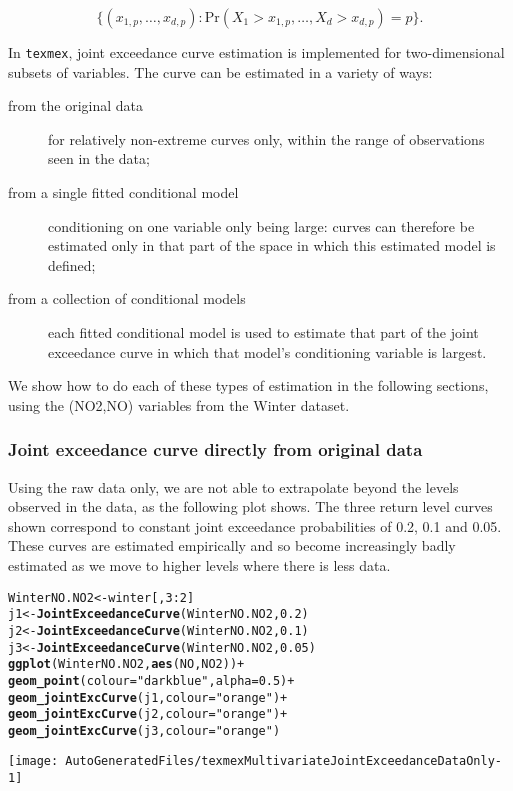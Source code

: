 \documentclass[10pt]{article}\usepackage[]{graphicx}\usepackage[]{color}
\makeatletter
\def\maxwidth{ %
  \ifdim\Gin@nat@width>\linewidth
    \linewidth
  \else
    \Gin@nat@width
  \fi
}
\newcommand{\hlnum}[1]{\textcolor[rgb]{0.686,0.059,0.569}{#1}}%
\newcommand{\hlstr}[1]{\textcolor[rgb]{0.192,0.494,0.8}{#1}}%
\newcommand{\hlopt}[1]{\textcolor[rgb]{0,0,0}{#1}}%
\newcommand{\hlstd}[1]{\textcolor[rgb]{0.345,0.345,0.345}{#1}}%
\newcommand{\hlkwb}[1]{\textcolor[rgb]{0.69,0.353,0.396}{#1}}%
\newcommand{\hlkwc}[1]{\textcolor[rgb]{0.333,0.667,0.333}{#1}}%
\newcommand{\hlkwd}[1]{\textcolor[rgb]{0.737,0.353,0.396}{\textbf{#1}}}%
\newenvironment{kframe}{%
 \def\at@end@of@kframe{}%
 \ifinner\ifhmode%
  \def\at@end@of@kframe{\end{minipage}}%
  \begin{minipage}{\columnwidth}%
 \fi\fi%
 \def\FrameCommand##1{\hskip\@totalleftmargin \hskip-\fboxsep
 \colorbox{shadecolor}{##1}\hskip-\fboxsep
     \hskip-\linewidth \hskip-\@totalleftmargin \hskip\columnwidth}%
 \MakeFramed {\advance\hsize-\width
   \@totalleftmargin\z@ \linewidth\hsize
   \@setminipage}}%
 {\par\unskip\endMakeFramed%
 \at@end@of@kframe}
\newenvironment{knitrout}{}{} %
\makeatother
\begin{document}
\[\{(x_{1,p},\ldots,x_{d,p}): \mbox{Pr}(X_1>x_{1,p},\ldots,X_d>x_{d,p}) = p\}.\]

In {\tt texmex}, joint exceedance curve estimation is implemented for two-dimensional subsets of variables.  The curve can be estimated in a variety of ways:

\begin{description}
\item[from the original data] for relatively non-extreme curves only, within the range of observations seen in the data;
\item[from a single fitted conditional model] conditioning on one variable only being large: curves can therefore be estimated only in that part of the space in which this estimated model is defined;
\item[from a collection of conditional models] each fitted conditional model is used to estimate that part of the joint exceedance curve in which that model's conditioning variable is largest.
\end{description}

We show how to do each of these types of estimation in the following sections, using the (NO2,NO) variables from the Winter dataset.

\subsubsection{Joint exceedance curve directly from original data}

Using the raw data only, we are not able to extrapolate beyond the levels observed in the data, as the following plot shows.  The three return level curves shown correspond to constant joint exceedance probabilities of 0.2, 0.1 and 0.05.  These curves are estimated empirically and so become increasingly badly estimated as we move to higher levels where there is less data.
\begin{knitrout}
\color{fgcolor}\begin{kframe}
\begin{alltt}
\hlstd{WinterNO.NO2} \hlkwb{<-} \hlstd{winter[,}\hlnum{3}\hlopt{:}\hlnum{2}\hlstd{]}
\hlstd{j1} \hlkwb{<-} \hlkwd{JointExceedanceCurve}\hlstd{(WinterNO.NO2,}\hlnum{0.2}\hlstd{)}
\hlstd{j2} \hlkwb{<-} \hlkwd{JointExceedanceCurve}\hlstd{(WinterNO.NO2,}\hlnum{0.1}\hlstd{)}
\hlstd{j3} \hlkwb{<-} \hlkwd{JointExceedanceCurve}\hlstd{(WinterNO.NO2,}\hlnum{0.05}\hlstd{)}
\hlkwd{ggplot}\hlstd{(WinterNO.NO2,}\hlkwd{aes}\hlstd{(NO,NO2))} \hlopt{+}
    \hlkwd{geom_point}\hlstd{(}\hlkwc{colour}\hlstd{=}\hlstr{"dark blue"}\hlstd{,}\hlkwc{alpha}\hlstd{=}\hlnum{0.5}\hlstd{)} \hlopt{+}
    \hlkwd{geom_jointExcCurve}\hlstd{(j1,}\hlkwc{colour}\hlstd{=}\hlstr{"orange"}\hlstd{)} \hlopt{+}
    \hlkwd{geom_jointExcCurve}\hlstd{(j2,}\hlkwc{colour}\hlstd{=}\hlstr{"orange"}\hlstd{)} \hlopt{+}
    \hlkwd{geom_jointExcCurve}\hlstd{(j3,}\hlkwc{colour}\hlstd{=}\hlstr{"orange"}\hlstd{)}
\end{alltt}
\end{kframe}
\texttt{[image: AutoGeneratedFiles/texmexMultivariateJointExceedanceDataOnly-1]} 

\end{knitrout}
\end{document}
